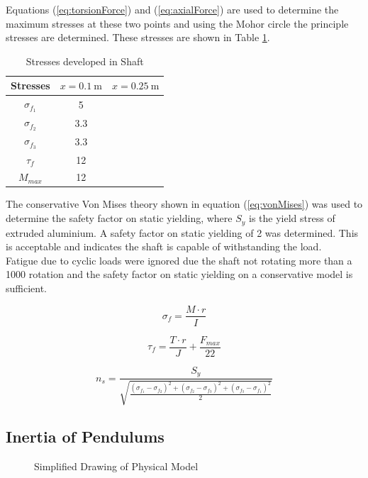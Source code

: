 Equations (\ref{eq:torsionForce}) and (\ref{eq:axialForce}) are used to determine the maximum stresses at these two points and using the Mohor circle the principle stresses are determined.  These stresses are shown in Table \ref{table:stresses}.\\


\begin{table}[]
	\centering
	\begin{tabular}{|c|c|c|}
		\hline
		Stresses & $x = \SI{0.1}{\meter}$ & $x=\SI{0.25}{\meter}$ \\
		\hline
		\hline
		$\sigma_{f_{1}}$ & \SI{5}{} & \\
		\hline
		$\sigma_{f_{2}}$ & \SI{3.3}{}& \\
		\hline
		$\sigma_{f_{3}}$ & \SI{3.3}{}& \\
		\hline
		$\tau_{f}$ & \SI{12}{}&  \\
		\hline
		$M_{max}$ & \SI{12}{}& \\
		\hline
	\end{tabular}
	\caption{Stresses developed in Shaft}
	\label{table:stresses}
\end{table}

The conservative Von Mises theory shown in equation (\ref{eq:vonMises}) was used to determine the safety factor on static yielding, where $S_{y}$ is the yield stress of extruded aluminium. A safety factor on static yielding of 2 was determined. This is acceptable and indicates the shaft is capable of withstanding the load.\\

Fatigue due to cyclic loads were ignored due the shaft not rotating more than a 1000 rotation and the safety factor on static yielding  on a conservative model is sufficient.

\begin{equation} \label{eq:axialForce}
\sigma_{f} = \frac{M\cdot r}{I}
\end{equation}

\begin{equation} \label{eq:torsionForce}
\tau_{f} = \frac{T\cdot r}{J} + \frac{F_{max}}{22}
\end{equation}


\begin{equation} \label{eq:vonMises}
n_{s} = \frac{S_{y}}{\sqrt{\frac{(\sigma_{f_{1}}-\sigma_{f_{2}})^2+(\sigma_{f_{2}}-\sigma_{f_{3}})^2+(\sigma_{f_{3}}-\sigma_{f_{1}})^2}{2}}}
\end{equation}

\subsection{Inertia of Pendulums}
\begin{figure}[h]
	\centering
	
	\caption{Simplified Drawing of Physical Model}
	\label{fig:model_drawing}
\end{figure}

